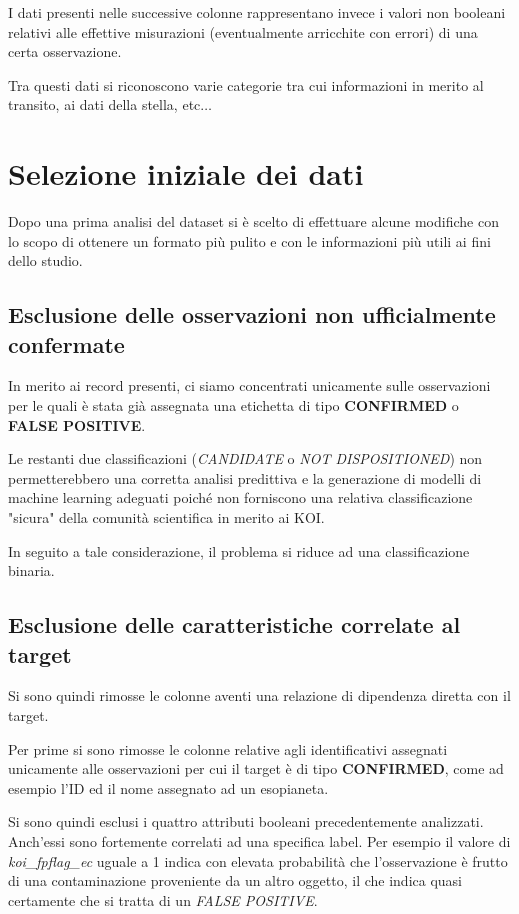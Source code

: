I dati presenti nelle successive colonne rappresentano invece i valori non 
booleani relativi alle effettive misurazioni (eventualmente arricchite con 
errori) di una certa osservazione. 

Tra questi dati si riconoscono varie categorie tra cui informazioni in merito al 
transito, ai dati della stella, etc$\ldots$

\section{Selezione iniziale dei dati}
Dopo una prima analisi del dataset si è scelto di effettuare alcune modifiche
con lo scopo di ottenere un formato più pulito e con le informazioni più utili 
ai fini dello studio.

\subsection{Esclusione delle osservazioni non ufficialmente confermate}
In merito ai record presenti, ci siamo concentrati unicamente sulle osservazioni per le quali 
è stata già assegnata una etichetta di tipo \textbf{CONFIRMED} o \textbf{FALSE POSITIVE}.

Le restanti due classificazioni (\textit{CANDIDATE} o 
\textit{NOT DISPOSITIONED}) non permetterebbero una corretta analisi predittiva e la generazione
di modelli di machine learning adeguati poiché non forniscono una relativa classificazione 
"sicura" della comunità scientifica in merito ai KOI. 

In seguito a tale considerazione, il problema si riduce ad una classificazione binaria.

\subsection{Esclusione delle caratteristiche correlate al target}
Si sono quindi rimosse le colonne aventi una relazione di dipendenza diretta
con il target. 

Per prime si sono rimosse le colonne relative agli identificativi assegnati 
unicamente alle osservazioni per cui il target è di tipo \textbf{CONFIRMED}, come ad
esempio l'ID ed il nome assegnato ad un esopianeta.

Si sono quindi esclusi i quattro attributi booleani precedentemente 
analizzati. Anch'essi sono fortemente correlati ad una specifica 
label. Per esempio il valore di \textit{koi\_fpflag\_ec} uguale a 1 indica con elevata 
probabilità che l'osservazione è frutto di una contaminazione proveniente da un altro oggetto,
il che indica quasi certamente che si tratta di un \textit{FALSE POSITIVE}.

